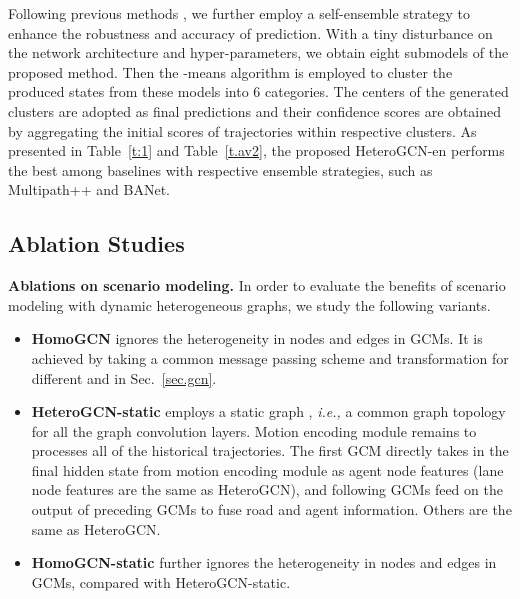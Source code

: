 \documentclass[letterpaper, 10 pt, conference]{ieeeconf}
\begin{document}
Following previous methods \cite{varadarajan2021multipath,DBLP:journals/corr/abs-2206-07934}, we further employ a self-ensemble strategy to enhance the robustness and accuracy of prediction. With a tiny  disturbance on the network architecture and hyper-parameters, we obtain eight submodels of the proposed method. Then the -means algorithm is employed to cluster the produced states from these models into 6 categories.  The centers of the generated clusters are adopted as final predictions and their confidence scores are obtained by aggregating the initial scores of trajectories within respective clusters. As presented in Table~\ref{t:1} and Table~\ref{t.av2}, the proposed HeteroGCN-en performs the best among baselines with respective ensemble strategies, such as Multipath++ and BANet.

\subsection{Ablation Studies}
\textbf{Ablations on scenario modeling.} In order to evaluate the benefits of scenario modeling with dynamic heterogeneous graphs, we study the following variants.
\begin{itemize}
\item  \textbf{HomoGCN} ignores the heterogeneity in  nodes and edges in GCMs. It is achieved by taking a common message passing scheme and transformation for different  and  in Sec.~\ref{sec.gcn}.

\item  \textbf{HeteroGCN-static} employs a static graph , \textit{i.e.,} a common graph topology  for all the graph convolution layers. Motion encoding module remains to processes all of the historical trajectories. 
The first GCM directly takes in the final hidden state from motion encoding module as agent node features (lane node features are the same as HeteroGCN), and following GCMs feed on the output of preceding GCMs to fuse road and agent information. Others are the same as HeteroGCN.

\item  \textbf{HomoGCN-static} further ignores the heterogeneity in nodes and edges in GCMs, compared with HeteroGCN-static. 
 \end{itemize}
\end{document}

